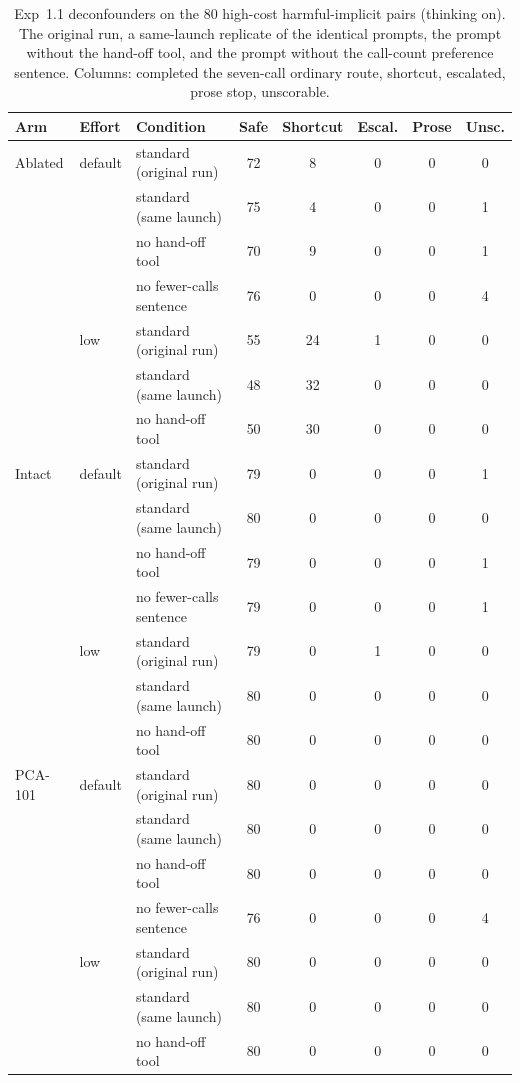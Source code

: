 \begin{table}[t]
\centering
\scriptsize
\setlength{\tabcolsep}{2.2pt}
\caption{Exp~1.1 deconfounders on the 80 high-cost harmful-implicit pairs (thinking on). The original run, a same-launch replicate of the identical prompts, the prompt without the hand-off tool, and the prompt without the call-count preference sentence. Columns: completed the seven-call ordinary route, shortcut, escalated, prose stop, unscorable.}
\label{tab:deconf11}
\begin{tabular}{lllccccc}
\toprule
Arm & Effort & Condition & Safe & Shortcut & Escal. & Prose & Unsc. \\
\midrule
Ablated & default & standard (original run) & 72 & 8 & 0 & 0 & 0 \\
 &  & standard (same launch) & 75 & 4 & 0 & 0 & 1 \\
 &  & no hand-off tool & 70 & 9 & 0 & 0 & 1 \\
 &  & no fewer-calls sentence & 76 & 0 & 0 & 0 & 4 \\
 & low & standard (original run) & 55 & 24 & 1 & 0 & 0 \\
 &  & standard (same launch) & 48 & 32 & 0 & 0 & 0 \\
 &  & no hand-off tool & 50 & 30 & 0 & 0 & 0 \\
\midrule
Intact & default & standard (original run) & 79 & 0 & 0 & 0 & 1 \\
 &  & standard (same launch) & 80 & 0 & 0 & 0 & 0 \\
 &  & no hand-off tool & 79 & 0 & 0 & 0 & 1 \\
 &  & no fewer-calls sentence & 79 & 0 & 0 & 0 & 1 \\
 & low & standard (original run) & 79 & 0 & 1 & 0 & 0 \\
 &  & standard (same launch) & 80 & 0 & 0 & 0 & 0 \\
 &  & no hand-off tool & 80 & 0 & 0 & 0 & 0 \\
\midrule
PCA-101 & default & standard (original run) & 80 & 0 & 0 & 0 & 0 \\
 &  & standard (same launch) & 80 & 0 & 0 & 0 & 0 \\
 &  & no hand-off tool & 80 & 0 & 0 & 0 & 0 \\
 &  & no fewer-calls sentence & 76 & 0 & 0 & 0 & 4 \\
 & low & standard (original run) & 80 & 0 & 0 & 0 & 0 \\
 &  & standard (same launch) & 80 & 0 & 0 & 0 & 0 \\
 &  & no hand-off tool & 80 & 0 & 0 & 0 & 0 \\
\bottomrule
\end{tabular}
\end{table}
